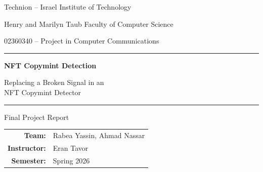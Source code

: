 \documentclass[11pt,a4paper]{article}
\begin{document}
\begin{titlepage}
  \centering
  {\large Technion -- Israel Institute of Technology\par}
  {\large Henry and Marilyn Taub Faculty of Computer Science\par}
  \vspace{0.6cm}
  {\normalsize 02360340 -- Project in Computer Communications\par}
  \vspace{3.2cm}
  {\color{technion}\rule{\linewidth}{1.2pt}\par}
  \vspace{0.5cm}
  {\Huge\bfseries NFT Copymint Detection\par}
  \vspace{0.4cm}
  {\Large Replacing a Broken Signal in an\\[2pt] NFT Copymint Detector\par}
  \vspace{0.5cm}
  {\color{technion}\rule{\linewidth}{1.2pt}\par}
  \vspace{1.2cm}
  {\Large Final Project Report\par}
  \vfill
  \begin{tabular}{rl}
    \textbf{Team:} & Rabea Yassin, Ahmad Nassar \\[3pt]
    \textbf{Instructor:} & Eran Tavor \\[3pt]
    \textbf{Semester:} & Spring 2026 \\
  \end{tabular}
  \vspace{1.5cm}
\end{titlepage}


\clearpage
\tableofcontents
\clearpage
\listoffigures
\listoftables
\clearpage
{}













\clearpage


\clearpage
\appendix

\end{document}
